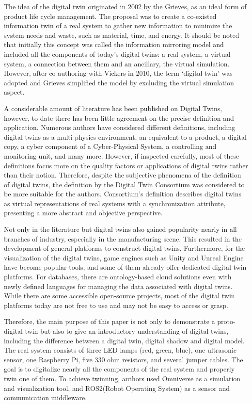 \documentclass[conference]{IEEEtran}
\begin{document}
    The idea of the digital twin originated in 2002 by the Grieves, as an ideal form of product life cycle management. 
    The proposal was to create a co-existed information twin of a real system to gather new information to minimize 
    the system needs and waste, such as material, time, and energy. It should be noted that initially this concept was 
    called the information mirroring model and included all the components of today's digital twins: a real system, 
    a virtual system, a connection between them and an ancillary, the virtual simulation. However, after co-authoring with Vickers in 2010, 
    the term `digital twin' was adopted and Grieves simplified the model by excluding the virtual simulation aspect.
    

    A considerable amount of literature has been published on Digital Twins, however, to date there has been little agreement on the precise definition and application. Numerous authors have considered different 
    definitions, including digital twins as a multi-physics environment, an equivalent to a product, a digital copy, a cyber component of a Cyber-Physical System, a controlling and monitoring unit,
    and many more. However, if inspected carefully, most of these definitions focus more on the quality factors or applications of digital twins rather than their notion.
    Therefore, despite the subjective phenomena of the definition of digital twins, the definition by the Digital Twin Consortium was considered to be more suitable for the authors. 
    Consortium's definition describes digital twins as virtual representations of real systems with a synchronization attribute,
    presenting a more abstract and objective perspective.

    Not only in the literature but digital twins also gained popularity nearly in all branches of industry, especially in the manufacturing scene.  
    This resulted in the development of general platforms to construct digital twins. Furthermore, for the visualization of the digital twins, 
    game engines such as Unity and  Unreal Engine have become popular tools, and some of them already offer dedicated digital 
    twin platforms. 
    For databases, there are ontology-based cloud solutions even with newly defined languages for 
    managing the data associated with digital twins. While there are some accessible open-source projects, 
    most of the digital twin platforms today are not free to use and may not be easy to access or grasp. 

    Therefore, the main purpose of this paper is not only to demonstrate a proto-digital twin but also to give an introductory 
    understanding of digital twins, including the difference between a digital twin, digital shadow and digital model. The real system consists of three LED lamps (red, green, blue),
    one ultrasonic sensor, one Raspberry Pi, five 330 ohm resistors, and several jumper cables.
    The goal is to digitalize nearly all the components of the real system and properly twin one of them. To achieve twinning, 
    authors used Omniverse as a simulation and visualization tool, and ROS2(Robot Operating System) as a sensor and communication middleware. 
\end{document}
